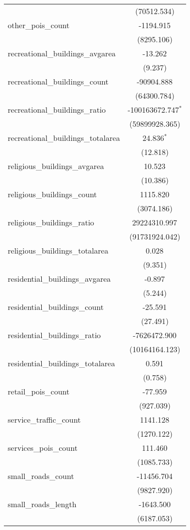 \begin{table}[!htbp]
\begin{tabular}{@{\extracolsep{5pt}}lc}
  & (70512.534) \\
 other_pois_count & -1194.915$^{}$ \\
  & (8295.106) \\
 recreational_buildings_avgarea & -13.262$^{}$ \\
  & (9.237) \\
 recreational_buildings_count & -90904.888$^{}$ \\
  & (64300.784) \\
 recreational_buildings_ratio & -100163672.747$^{*}$ \\
  & (59899928.365) \\
 recreational_buildings_totalarea & 24.836$^{*}$ \\
  & (12.818) \\
 religious_buildings_avgarea & 10.523$^{}$ \\
  & (10.386) \\
 religious_buildings_count & 1115.820$^{}$ \\
  & (3074.186) \\
 religious_buildings_ratio & 29224310.997$^{}$ \\
  & (91731924.042) \\
 religious_buildings_totalarea & 0.028$^{}$ \\
  & (9.351) \\
 residential_buildings_avgarea & -0.897$^{}$ \\
  & (5.244) \\
 residential_buildings_count & -25.591$^{}$ \\
  & (27.491) \\
 residential_buildings_ratio & -7626472.900$^{}$ \\
  & (10164164.123) \\
 residential_buildings_totalarea & 0.591$^{}$ \\
  & (0.758) \\
 retail_pois_count & -77.959$^{}$ \\
  & (927.039) \\
 service_traffic_count & 1141.128$^{}$ \\
  & (1270.122) \\
 services_pois_count & 111.460$^{}$ \\
  & (1085.733) \\
 small_roads_count & -11456.704$^{}$ \\
  & (9827.920) \\
 small_roads_length & -1643.500$^{}$ \\
  & (6187.053) \\

\end{tabular}
\end{table}
